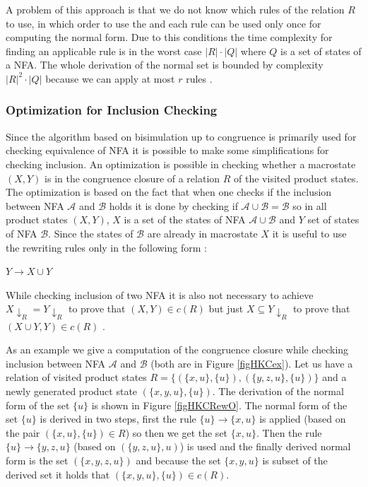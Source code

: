A problem of this approach is that we do not know which rules of the relation $R$ to use, in which order to use the 
and each rule can be used only once for computing the normal form. 
Due to this conditions the time complexity for finding an applicable rule is in the worst case $|R|\cdot|Q|$ where $Q$ is a set of states of a NFA.
The whole derivation of the normal set is bounded by complexity $|R|^2 \cdot |Q|$ because we can apply at most $r$ rules \cite{popl13}.

\subsubsection{Optimization for Inclusion Checking}
\label{congrOpt}
Since the algorithm based on bisimulation up to congruence is primarily used for checking equivalence of NFA it is possible to make some simplifications for
checking inclusion. An optimization is possible in checking whether a macrostate $(X,Y)$ is in the congruence closure of a relation $R$ of the visited
product states. The optimization
is based on the fact that when one checks if the inclusion between NFA $\mathcal{A}$ and $\mathcal{B}$ holds it is done by checking if $\mathcal{A}\cup\mathcal{B}=
\mathcal{B}$ so in all product states $(X,Y)$, $X$ is a set of the states of NFA $\mathcal{A}\cup\mathcal{B}$ and $Y$ set of states of NFA $\mathcal{B}$. Since the
states of $\mathcal{B}$ are already in macrostate $X$ it is useful to use the rewriting rules only in the following form \cite{popl13}:
\begin{center}
$Y\rightarrow X\cup Y$
\end{center}
While checking inclusion of two NFA it is also not necessary to achieve $X{\downarrow_R}=Y{\downarrow_R}$ to prove that $(X,Y)\in c(R)$ 
but just $X \subseteq Y{\downarrow_R}$ to prove that $(X\cup Y,Y)\in c(R)$ \cite{popl13}.

As an example we give a computation of the congruence closure while checking inclusion between NFA $\mathcal{A}$ and $\mathcal{B}$ (both are in Figure 
\ref{figHKCex}). Let us have a relation of visited product states $R=\{(\{x,u\},\{u\}),(\{y,z,u\},\{u\})\}$ and a 
newly generated product state $(\{x,y,u\},\{u\})$. The
derivation of the normal form of the set $\{u\}$ is shown in Figure \ref{figHKCRewO}. 
The normal form of the set $\{u\}$ is derived in two steps, first the rule $\{u\}\rightarrow\{x,u\}$ is applied (based on the pair $(\{x,u\},\{u\})\in R$) 
so then we get the set $\{x,u\}$. 
Then the rule $\{u\}\rightarrow\{y,z,u\}$ (based on $(\{y,z,u\},u)$) is used and the finally derived normal form is the set $(\{x,y,z,u\})$ 
and because the set $\{x,y,u\}$ is subset of the derived set it holds that $(\{x,y,u\},\{u\})\in c(R)$.

